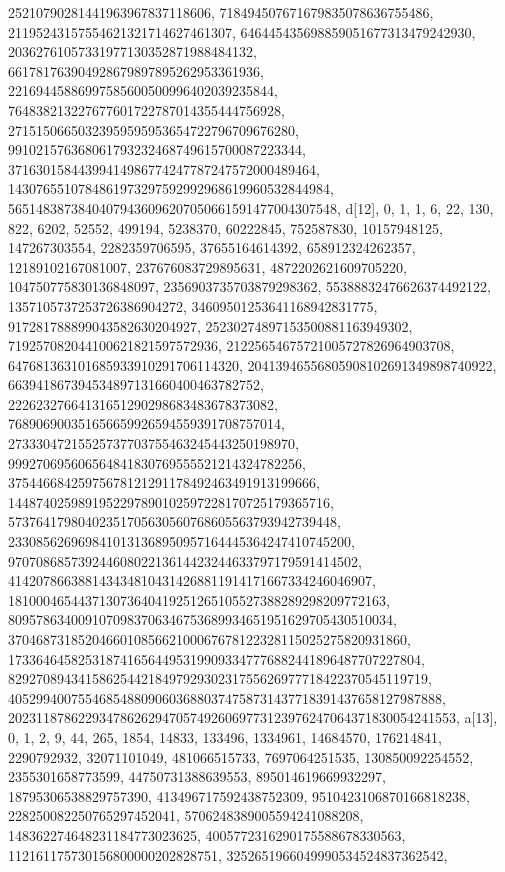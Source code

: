 {{{   25210790281441963967837118606, 718494507671679835078636755486, 
   21195243157554621321714627461307, 646445435698859051677313479242930, 
   20362761057331977130352871988484132, 661781763904928679897895262953361936, 
   22169445886997585600500996402039235844, 
   764838213227677601722787014355444756928, 
   27151506650323959595953654722796709676280, 
   991021576368061793232468749615700087223344, 
   37163015844399414986774247787247572000489464, 
   1430765510784861973297592992968619960532844984, 
   56514838738404079436096207050661591477004307548}}, 
 {d[12], {0, 1, 1, 6, 22, 130, 822, 6202, 52552, 499194, 5238370, 60222845, 
   752587830, 10157948125, 147267303554, 2282359706595, 37655164614392, 
   658912324262357, 12189102167081007, 237676083729895631, 
   4872202621609705220, 104750775830136848097, 2356903735703879298362, 
   55388832476626374492122, 1357105737253726386904272, 
   34609501253641168942831775, 917281788899043582630204927, 
   25230274897153500881163949302, 719257082044100621821597572936, 
   21225654675721005727826964903708, 647681363101685933910291706114320, 
   20413946556805908102691349898740922, 663941867394534897131660400463782752, 
   22262327664131651290298683483678373082, 
   768906900351656659926594559391708757014, 
   27333047215525737703755463245443250198970, 
   999270695606564841830769555521214324782256, 
   37544668425975678121291178492463491913199666, 
   1448740259891952297890102597228170725179365716, 
   57376417980402351705630560768605563793942739448, 
   2330856269698410131368950957164445364247410745200, 
   97070868573924460802213614423244633797179591414502, 
   4142078663881434348104314268811914171667334246046907, 
   181000465443713073640419251265105527388289298209772163, 
   8095786340091070983706346753689934651951629705430510034, 
   370468731852046601085662100067678122328115025275820931860, 
   17336464582531874165644953199093347776882441896487707227804, 
   829270894341586254421849792930231755626977718422370545119719, 
   40529940075546854880906036880374758731437718391437658127987888, 
   2023118786229347862629470574926069773123976247064371830054241553}}, 
 {a[13], {0, 1, 2, 9, 44, 265, 1854, 14833, 133496, 1334961, 14684570, 
   176214841, 2290792932, 32071101049, 481066515733, 7697064251535, 
   130850092254552, 2355301658773599, 44750731388639553, 895014619669932297, 
   18795306538829757390, 413496717592438752309, 9510423106870166818238, 
   228250082250765297452041, 5706248389005594241088208, 
   148362274648231184773023625, 4005772316290175588678330563, 
   112161175730156800000202828751, 3252651966049990534524837362542, 
}}}
